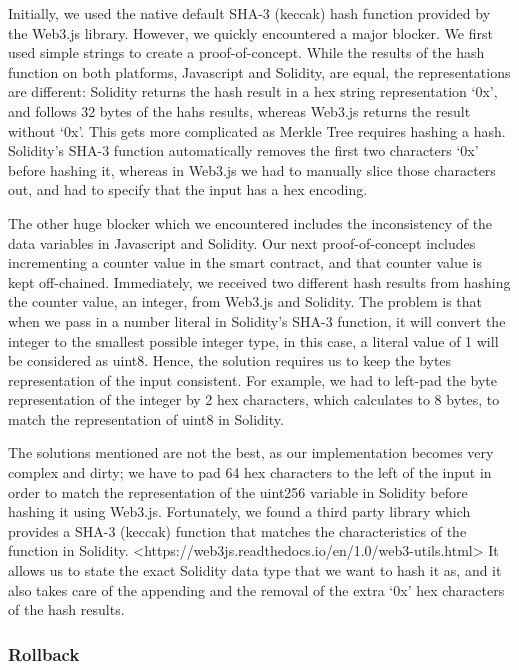 Initially, we used the native default SHA-3 (keccak) hash function provided by the Web3.js library. However, we quickly encountered a major blocker. We first used simple strings to create a proof-of-concept. While the results of the hash function on both platforms, Javascript and Solidity, are equal, the representations are different: Solidity returns the hash result in a hex string representation ‘0x’, and follows 32 bytes of the hahs results, whereas Web3.js returns the result without ‘0x’. This gets more complicated as Merkle Tree requires hashing a hash. Solidity’s SHA-3 function automatically removes the first two characters ‘0x’ before hashing it, whereas in Web3.js we had to manually slice those characters out, and had to specify that the input has a hex encoding.

The other huge blocker which we encountered includes the inconsistency of the data variables in Javascript and Solidity. Our next proof-of-concept includes incrementing a counter value in the smart contract, and that counter value is kept off-chained. Immediately, we received two different hash results from hashing the counter value, an integer, from Web3.js and Solidity. The problem is that when we pass in a number literal in Solidity’s SHA-3 function, it will convert the integer to the smallest possible integer type, in this case, a literal value of 1 will be considered as uint8. Hence, the solution requires us to keep the bytes representation of the input consistent. For example, we had to left-pad the byte representation of the integer by 2 hex characters, which calculates to 8 bytes, to match the representation of uint8 in Solidity. 

The solutions mentioned are not the best, as our implementation becomes very complex and dirty; we have to pad 64 hex characters to the left of the input in order to match the representation of the uint256 variable in Solidity before hashing it using Web3.js. Fortunately, we found a third party library which provides a SHA-3 (keccak) function that matches the characteristics of the function in Solidity. <https://web3js.readthedocs.io/en/1.0/web3-utils.html> It allows us to state the exact Solidity data type that we want to hash it as, and it also takes care of the appending and the removal of the extra ‘0x’ hex characters of the hash results.

\subsubsection*{Rollback}

